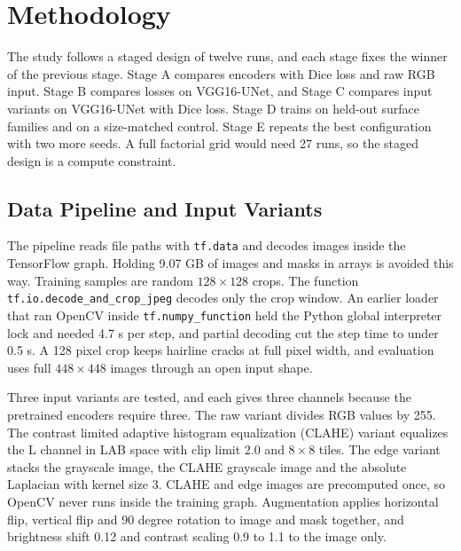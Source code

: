 \documentclass[conference]{IEEEtran}
\begin{document}
\section{Methodology}
\label{sec:method}
The study follows a staged design of twelve runs, and each stage fixes the winner of the previous stage. Stage A compares encoders with Dice loss and raw RGB input. Stage B compares losses on VGG16-UNet, and Stage C compares input variants on VGG16-UNet with Dice loss. Stage D trains on held-out surface families and on a size-matched control. Stage E repeats the best configuration with two more seeds. A full factorial grid would need 27 runs, so the staged design is a compute constraint.

\subsection{Data Pipeline and Input Variants}
The pipeline reads file paths with \texttt{tf.data} and decodes images inside the TensorFlow graph. Holding 9.07 GB of images and masks in arrays is avoided this way. Training samples are random $128\times128$ crops. The function \texttt{tf.io.decode\_and\_\allowbreak crop\_jpeg} decodes only the crop window. An earlier loader that ran OpenCV inside \texttt{tf.numpy\_function} held the Python global interpreter lock and needed 4.7 s per step, and partial decoding cut the step time to under 0.5 s. A 128 pixel crop keeps hairline cracks at full pixel width, and evaluation uses full $448\times448$ images through an open input shape.

Three input variants are tested, and each gives three channels because the pretrained encoders require three. The raw variant divides RGB values by 255. The contrast limited adaptive histogram equalization (CLAHE) variant equalizes the L channel in LAB space with clip limit 2.0 and $8\times8$ tiles. The edge variant stacks the grayscale image, the CLAHE grayscale image and the absolute Laplacian with kernel size 3. CLAHE and edge images are precomputed once, so OpenCV never runs inside the training graph. Augmentation applies horizontal flip, vertical flip and 90 degree rotation to image and mask together, and brightness shift 0.12 and contrast scaling 0.9 to 1.1 to the image only.
\end{document}
